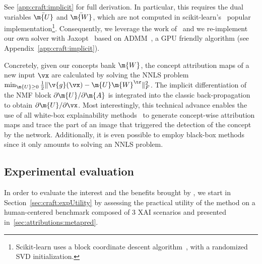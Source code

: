 See \autoref{app:craft:implicit} for full derivation. In particular, this requires the dual variables $\bar{\m{U}}$ and $\bar{\m{W}}$, which are not computed in scikit-learn's~\cite{pedregosa2011scikit} popular implementation\footnote{Scikit-learn uses a block coordinate descent algorithm~\cite{cichocki2009fast,fevotte2011algorithms}, with a randomized SVD initialization.}. Consequently, we leverage the work of~\cite{huang2016flexible} and we re-implement our own solver with Jaxopt~\cite{blondel2021implicitdiff} based on ADMM~\cite{boyd2011distributed}, a GPU friendly algorithm (see Appendix~\ref{app:craft:implicit}).




Concretely, given our concepts bank $\m{W}$, the concept attribution maps of a new input $\vx$ are calculated by solving the NNLS problem $\min_{\m{U} \geq 0} \frac{1}{2}\|\v{g}(\vx)-\m{U}\m{W}^\tr\|^2_F$. The implicit differentiation of the NMF block $\partial \m{U} / \partial \m{A}$ is integrated into the classic back-propagation to obtain $\partial \m{U} / \partial \vx$. Most interestingly, this technical advance enables the use of all white-box explainability methods~\cite{smilkov2017smoothgrad, zeiler2014visualizing, sundararajan2017axiomatic, selvaraju2017gradcam, springenberg2014striving} to generate concept-wise attribution maps and trace the part of an image that triggered the detection of the concept by the network. Additionally, it is even possible to employ black-box methods~\cite{ribeiro2016lime, petsiuk2018rise, lundberg2017unified, fel2021sobol} since it only amounts to solving an NNLS problem. %



\subsection{Experimental evaluation}\label{sec:craft:exp}


In order to evaluate the interest and the benefits brought by \craft, we start in Section~\ref{sec:craft:expUtility} by assessing the practical utility of the method on a human-centered benchmark composed of 3 XAI scenarios and presented in~\autoref{sec:attributions:metapred}.


